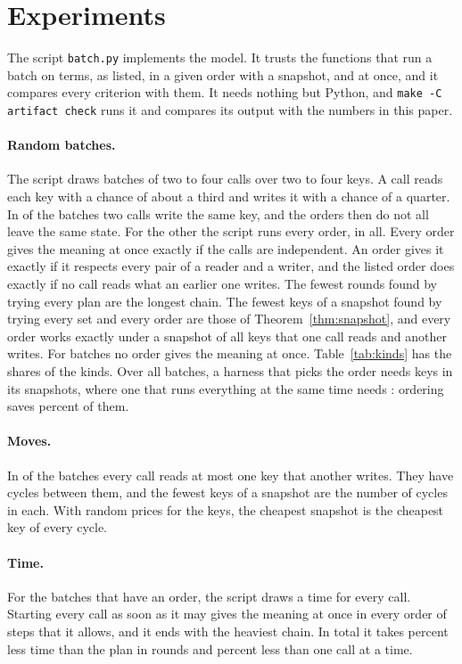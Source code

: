 \documentclass[acmsmall,nonacm,screen]{acmart}
\newcommand{\claim}[2]{#2}
\begin{document}
\section{Experiments}\label{sec:experiments}

The script \texttt{batch.py} implements the model. It trusts the functions that run a batch
on terms, as listed, in a given order with a snapshot, and at once, and it compares every
criterion with them. It needs nothing but Python, and \texttt{make -C artifact check} runs
it and compares its output with the numbers in this paper.

\paragraph{Random batches.} The script draws \exAll{} batches of two to four calls over two
to four keys. A call reads each key with a chance of about a third and writes it with a
chance of a quarter. In \exTwoWriters{} of the batches two calls write the same key, and the
orders then do not all leave the same state. For the other \exBatches{} the script runs
every order, \exOrders{} in all. \claim{batches}{Every order gives the meaning at once
exactly if the calls are independent. An order gives it exactly if it respects every pair
of a reader and a writer, and the listed order does exactly if no call reads what an earlier
one writes. The fewest rounds found by trying every plan are the longest chain. The fewest
keys of a snapshot found by trying every set and every order are those of
Theorem~\ref{thm:snapshot}, and every order works exactly under a snapshot of all keys that
one call reads and another writes. For \exCycle{} batches no order gives the meaning at
once.} Table~\ref{tab:kinds} has the shares of the kinds. Over all batches, a harness that
picks the order needs \exSnapshotKeys{} keys in its snapshots, where one that runs everything
at the same time needs \exSharedKeys{}: ordering saves \exSaved{} percent of them.

\paragraph{Moves.} \claim{moves}{In \exMoves{} of the batches every call reads at most one
key that another writes. They have \exMoveCycles{} cycles between them, and the fewest keys
of a snapshot are the number of cycles in each. With random prices for the keys, the
cheapest snapshot is the cheapest key of every cycle.}

\paragraph{Time.} \claim{time}{For the \exTimed{} batches that have an order, the script
draws a time for every call. Starting every call as soon as it may gives the meaning at
once in every order of steps that it allows, and it ends with the heaviest chain. In total
it takes \exSoonOverRounds{} percent less time than the plan in rounds and \exSoonOverSerial{}
percent less than one call at a time.}
\end{document}
